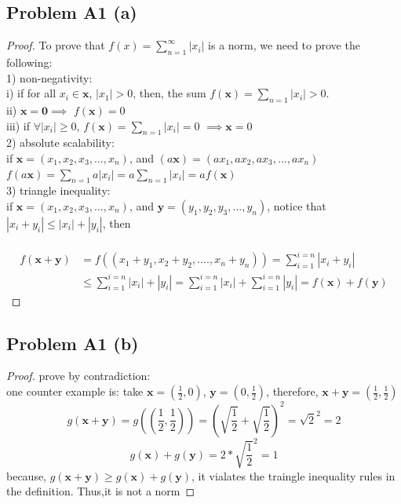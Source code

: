 \documentclass[12pt]{article}
\begin{document}
\subsection*{Problem A1 (a)}
\begin{proof}
        To prove that $f(x) = \sum_{n=1}^{\infty} |x_i|$ is a norm, we need to prove the following: \\
        1) non-negativity: \\
        \indent i) if for all $x_i \in \mathbf{x}$, $|x_1| > 0$, then, the sum $f(\mathbf{x}) = \sum_{n=1} |x_i| > 0$. \\
        \indent ii) $\mathbf{x} = \mathbf{0} \implies $ $f(\mathbf{x})=0$\\
        \indent iii) if $\forall |x_i|\geq  0$, $f(\mathbf{x}) =  \sum_{n=1}|x_i| = 0 $ $\implies \mathbf{x} = 0$  \\
 2) absolute scalability: \\
\indent  if $\mathbf{x} = (x_1,x_2,x_3,...,x_n)$, and  $(a\mathbf{x}) = (ax_1,ax_2,ax_3,...,ax_n)$\\
\indent $f(a\mathbf{x}) = \sum_{n=1} a|x_i| = a \sum_{n=1} |x_i| = a f(\mathbf{x})$ \\ 
3) triangle inequality: \\
\indent if $\mathbf{x} = (x_1,x_2,x_3,...,x_n)$, and $\mathbf{y} = (y_1,y_2,y_3,...,y_n)$, notice that $|x_i + y_i| \leq  |x_i| + |y_i|$, then \\\
\[
\begin{aligned}
        f(\mathbf{x} + \mathbf{y}) &= f ((x_1+y_1,x_2+y_2,....,x_n+y_n)) = \sum_{i=1}^{i =n} |x_i + y_i| \\ 
                                   & \leq \sum_{i=1}^{i =n} |x_i| + |y_i|  = \sum_{i=1}^{i =n} |x_i| +\sum_{i=1}^{i =n} |y_i| = f(\mathbf{x}) + f(\mathbf{y}) 
\end{aligned}        
\]
\end{proof}
\subsection*{Problem A1 (b)}
\begin{proof}
       prove by contradiction: \\ 
       one counter example is: take $\mathbf{x} = (\frac{1}{2},0)$, $\mathbf{y} = (0,\frac{1}{2})$, therefore, $\mathbf{x+y} = (\frac{1}{2},\frac{1}{2})$
       $$g(\mathbf{x+y}) = g((\frac{1}{2},\frac{1}{2})) = (\sqrt{\frac{1}{2}} + \sqrt{\frac{1}{2}} ) ^2 = \sqrt{2}^2  = 2 $$
       $$g(\mathbf{x}) + g(\mathbf{y}) = 2* \sqrt{\frac{1}{2}}^2 = 1 $$
       because, $g(\mathbf{x+y}) \geq g(\mathbf{x}) + g(\mathbf{y})$, it vialates the traingle inequality rules in the definition. Thus,it is not a norm 


\end{proof}
\end{document}
